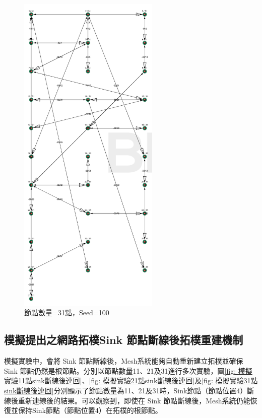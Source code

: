 \begin{ZhChapter}
\begin{figure}[H]
    \centering
    \includegraphics[width = 0.6\textwidth]{image/模擬實驗31點seed=100.png}
    \caption{節點數量=31點，Seed=100}
    \label{fig: 模擬實驗31點seed=100}
\end{figure}

\subsection{模擬提出之網路拓樸Sink 節點斷線後拓樸重建機制}
模擬實驗中，會將 Sink 節點斷線後，Mesh系統能夠自動重新建立拓樸並確保 Sink 節點仍然是根節點。分別以節點數量11、21及31進行多次實驗，圖\ref{fig: 模擬實驗11點sink斷線後連回}、\ref{fig: 模擬實驗21點sink斷線後連回}及\ref{fig: 模擬實驗31點sink斷線後連回}分別顯示了節點數量為11、21及31時，Sink節點（節點位置4）斷線後重新連線後的結果。可以觀察到，即使在 Sink 節點斷線後，Mesh系統仍能恢復並保持Sink節點（節點位置4）在拓樸的根節點。


\end{ZhChapter}

